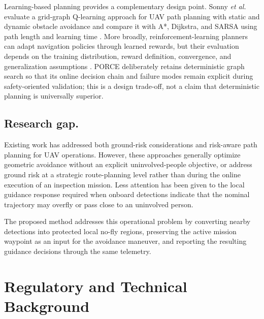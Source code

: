 \documentclass[electronics,article,submit,moreauthors]{Definitions/mdpi}
\DeclareRobustCommand{\added}[1]{#1}%
\DeclareRobustCommand{\added}[1]{\textcolor{green!50!black}{#1}}
\def\added#1{#1}%
\begin{document}
\added{Learning-based planning provides a complementary design point. Sonny \emph{et al.} evaluate a grid-graph Q-learning approach for UAV path planning with static and dynamic obstacle avoidance and compare it with A*, Dijkstra, and SARSA using path length and learning time \cite{sonny2023qlearning}. More broadly, reinforcement-learning planners can adapt navigation policies through learned rewards, but their evaluation depends on the training distribution, reward definition, convergence, and generalization assumptions \cite{meng2025advances}. PORCE deliberately retains deterministic graph search so that its online decision chain and failure modes remain explicit during safety-oriented validation; this is a design trade-off, not a claim that deterministic planning is universally superior.}









\subsection{Research gap.}
Existing work has addressed both ground-risk considerations and risk-aware path planning for UAV operations. However, these approaches generally optimize geometric avoidance without an explicit uninvolved-people objective, or address ground risk at a strategic route-planning level rather than during the online execution of an inspection mission. Less attention has been given to the local guidance response required when onboard detections indicate that the nominal trajectory may overfly or pass close to an uninvolved person.

The proposed method addresses this operational problem by converting nearby detections into protected local no-fly regions, preserving the active mission waypoint as an input for the avoidance maneuver, and reporting the resulting guidance decisions through the same telemetry.


\section{\texorpdfstring{\added{Regulatory and Technical Background}}{Regulatory and Technical Background}}
\label{sec:regulatory_background}
\end{document}
